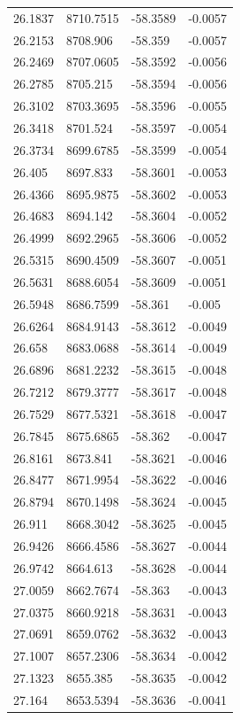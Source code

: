 \begin{table}[H]
\begin{tabular}{llll}
26.1837 & 8710.7515 & -58.3589 & -0.0057 \\
26.2153 & 8708.906 & -58.359 & -0.0057 \\
26.2469 & 8707.0605 & -58.3592 & -0.0056 \\
26.2785 & 8705.215 & -58.3594 & -0.0056 \\
26.3102 & 8703.3695 & -58.3596 & -0.0055 \\
26.3418 & 8701.524 & -58.3597 & -0.0054 \\
26.3734 & 8699.6785 & -58.3599 & -0.0054 \\
26.405 & 8697.833 & -58.3601 & -0.0053 \\
26.4366 & 8695.9875 & -58.3602 & -0.0053 \\
26.4683 & 8694.142 & -58.3604 & -0.0052 \\
26.4999 & 8692.2965 & -58.3606 & -0.0052 \\
26.5315 & 8690.4509 & -58.3607 & -0.0051 \\
26.5631 & 8688.6054 & -58.3609 & -0.0051 \\
26.5948 & 8686.7599 & -58.361 & -0.005 \\
26.6264 & 8684.9143 & -58.3612 & -0.0049 \\
26.658 & 8683.0688 & -58.3614 & -0.0049 \\
26.6896 & 8681.2232 & -58.3615 & -0.0048 \\
26.7212 & 8679.3777 & -58.3617 & -0.0048 \\
26.7529 & 8677.5321 & -58.3618 & -0.0047 \\
26.7845 & 8675.6865 & -58.362 & -0.0047 \\
26.8161 & 8673.841 & -58.3621 & -0.0046 \\
26.8477 & 8671.9954 & -58.3622 & -0.0046 \\
26.8794 & 8670.1498 & -58.3624 & -0.0045 \\
26.911 & 8668.3042 & -58.3625 & -0.0045 \\
26.9426 & 8666.4586 & -58.3627 & -0.0044 \\
26.9742 & 8664.613 & -58.3628 & -0.0044 \\
27.0059 & 8662.7674 & -58.363 & -0.0043 \\
27.0375 & 8660.9218 & -58.3631 & -0.0043 \\
27.0691 & 8659.0762 & -58.3632 & -0.0043 \\
27.1007 & 8657.2306 & -58.3634 & -0.0042 \\
27.1323 & 8655.385 & -58.3635 & -0.0042 \\
27.164 & 8653.5394 & -58.3636 & -0.0041 \\

\end{tabular}
\end{table}
